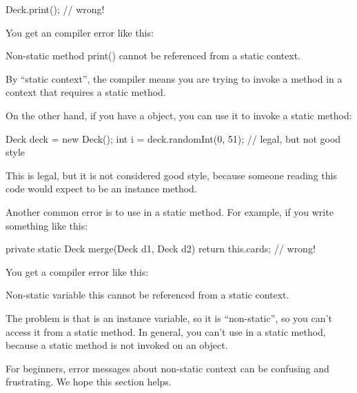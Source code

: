 \begin{code}
Deck.print();  // wrong!
\end{code}



You get an compiler error like this:

\begin{stdout}
Non-static method print() cannot be referenced from a
static context.
\end{stdout}

By ``static context'', the compiler means you are trying to invoke a method in a context that requires a static method.

On the other hand, if you have a  object, you can use it to invoke a static method:

\begin{code}
Deck deck = new Deck();
int i = deck.randomInt(0, 51);  // legal, but not good style
\end{code}

This is legal, but it is not considered good style, because someone reading this code would expect  to be an instance method.

Another common error is to use  in a static method.
For example, if you write something like this:

\begin{code}
private static Deck merge(Deck d1, Deck d2) {
    return this.cards;  // wrong!
}
\end{code}

You get a compiler error like this:

\begin{stdout}
Non-static variable this cannot be referenced from a
static context.
\end{stdout}

The problem is that  is an instance variable, so it is ``non-static'', so you can't access it from a static method.
In general, you can't use  in a static method, because a static method is not invoked on an object.

For beginners, error messages about non-static context can be confusing and frustrating.
We hope this section helps.


%



